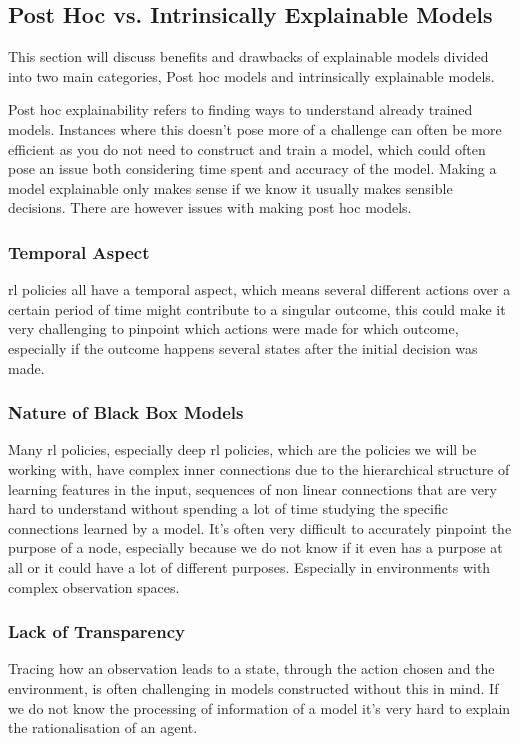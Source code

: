 \documentclass[UKenglish]{uiomasterthesis}
\begin{document}
\subsection{Post Hoc vs. Intrinsically Explainable Models}
This section will discuss benefits and drawbacks of explainable models divided into two main categories, Post hoc models and intrinsically explainable models.

Post hoc explainability refers to finding ways to understand already trained models. Instances where this doesn't pose more of a challenge can often be more efficient as you do not need to construct and train a model, which could often pose an issue both considering time spent and accuracy of the model. Making a model explainable only makes sense if we know it usually makes sensible decisions. There are however issues with making post hoc models.

\subsubsection{Temporal Aspect}
\ac{rl} policies all have a temporal aspect, which means several different actions over a certain period of time might contribute to a singular outcome, this could make it very challenging to pinpoint which actions were made for which outcome, especially if the outcome happens several states after the initial decision was made.

\subsubsection{Nature of Black Box Models}
Many \ac{rl} policies, especially deep \ac{rl} policies, which are the policies we will be working with, have complex inner connections due to the hierarchical structure of learning features in the input, sequences of non linear connections that are very hard to understand without spending a lot of time studying the specific connections learned by a model. It's often very difficult to accurately pinpoint the purpose of a node, especially because we do not know if it even has a purpose at all or it could have a lot of different purposes. Especially in environments with complex observation spaces.


\subsubsection{Lack of Transparency}
Tracing how an observation leads to a state, through the action chosen and the environment, is often challenging in models constructed without this in mind. If we do not know the processing of information of a model it's very hard to explain the rationalisation of an agent.
\end{document}
